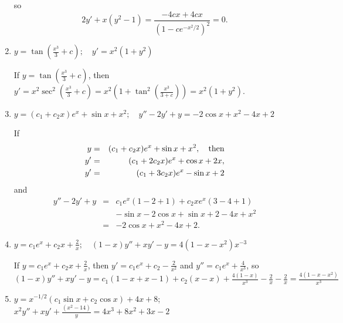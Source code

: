 \documentclass{ximera}
\begin{document}
\begin{problem}
\begin{enumerate}
\begin{solution}
so
$$
2y'+x(y^2-1)=\frac{-4cx+4cx}{(1-ce^{-x^2/2})^2}=0.
$$
\end{solution}

\item %
$y=\tan\left(\frac{x^3}{3}+c\right);     \quad
y'=x^2(1+y^2)$



\begin{solution}
    If $y=\tan\left( \frac{x^3}{3}+c\right)$, then
$y'=x^2\sec^2\left(\frac{x^3}{3}+c\right)=
x^2\left(1+\tan^2\left(\frac{x^3}{3+c}\right)\right)=
x^2(1+y^2)$.
\end{solution}

\item %
$y=(c_1+c_2x)e^x+\sin x+x^2;    \quad
y''-2y'+y=-2 \cos x+x^2-4x+2$



\begin{solution}
    If
\begin{eqnarray*}
y&=&(c_1+c_2x)e^x+\sin x+x^2,\mbox{\quad then}\\
y'&=&(c_1+2c_2x)e^x+\cos x+2x,\\
y'&=&(c_1+3c_2x)e^x-\sin x+2
\end{eqnarray*}
and
\begin{eqnarray*}
y''-2y'+y&=&c_1e^x(1-2+1)+c_2xe^x(3-4+1)\\
&&-\sin x-2\cos x+\sin x+2-4x+x^2\\
&=&-2 \cos x+x^2-4x+2.
\end{eqnarray*}
\end{solution}

\item %
$y=c_1e^x+c_2x+\frac{2}{ x};     \quad
(1-x)y''+xy'- y=4(1-x-x^2)x^{-3}$



\begin{solution}
    If $y=c_1e^x+c_2x+\frac{2}{x}$, then
$y'=c_1e^x+c_2-\frac{2}{x^2}$ and $y''=c_1e^x+\frac{4}{x^3}$, so
$(1-x)y''+xy'- y=c_1(1-x+x-1)+c_2(x-x)+\frac{4(1-x)}{x^3}-\frac{2}{
x}-\frac{2}{x}= \frac{4(1-x-x^2)}{x^3}$
\end{solution}

\item %
$y=x^{-1/2}(c_1\sin x+c_2 \cos x)+4x+8$;  
$x^2y''+xy'+\frac{\left(x^2-{1}{4}\right)}y=4x^3+8x^2+3x-2$




\end{enumerate}
\end{problem}
\end{document}
